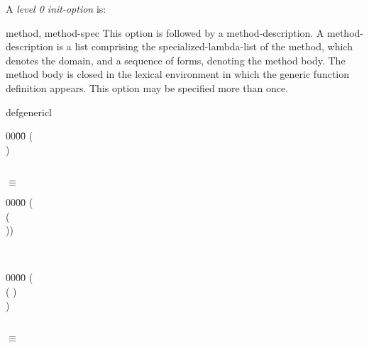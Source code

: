 \begin{optDefinition}
A {\em level 0 init-option\/} is:
\begin{options}
    \item[method, method-spec] This option is followed by a method-description.
    A method-description is a list comprising the specialized-lambda-list of the
    method, which denotes the domain, and a sequence of forms, denoting the
    method body.  The method body is closed in the lexical environment in which
    the generic function definition appears. This option may be specified more
    than once.
\end{options}
%
\rewriterules
\label{defgeneric-rewrite-rules}
%
%
\begin{RewriteTable}{defgeneric}{l}
\begin{minipage}[t]{\linewidth}
    \begin{tabbing}
        00\=00\= \kill
        (  \\
        \> )
    \end{tabbing}
\end{minipage}\\
\hspace{2cm}$\equiv$
\begin{minipage}[t]{\linewidth}
    \begin{tabbing}
        00\=00\= \kill
        ( \\
        \>( \\
        \>\> ))
    \end{tabbing}
\end{minipage}\\
%
\begin{minipage}[t]{\linewidth}
    \begin{tabbing}
        00\=00\= \kill
        ( \\
        \>( ) \\
        \> )
    \end{tabbing}
\end{minipage}\\
\hspace{2cm}$\equiv$
\begin{minipage}[t]{\linewidth}
    \begin{tabbing}

\end{tabbing}
\end{minipage}
\end{RewriteTable}
\end{optDefinition}
